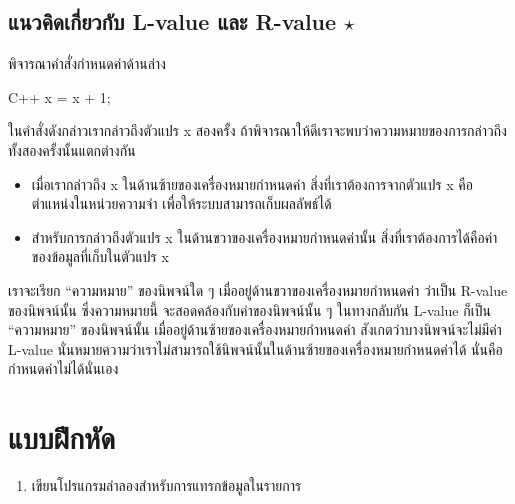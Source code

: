 \subsection{แนวคิด{\wbr}เกี่ยว{\wbr}กับ L-value และ R-value $\star$}
\label{sect:array-lval-rval}

พิจารณา{\wbr}คำ{\wbr}สั่ง{\wbr}กำหนด{\wbr}ค่า{\wbr}ด้าน{\wbr}ล่าง{\wbr}

\latintext
\begin{codelist}{C++}{}
x = x + 1;
\end{codelist}
\thaitext

ใน{\wbr}คำ{\wbr}สั่ง{\wbr}ดัง{\wbr}กล่าว{\wbr}เรา{\wbr}กล่าว{\wbr}ถึง{\wbr}ตัวแปร {\ct x} สอง{\wbr}ครั้ง{\wbr}
ถ้า{\wbr}พิจารณา{\wbr}ให้{\wbr}ดี{\wbr}เรา{\wbr}จะ{\wbr}พบ{\wbr}ว่า{\wbr}ความหมาย{\wbr}ของ{\wbr}การ{\wbr}กล่าว{\wbr}ถึง{\wbr}ทั้ง{\wbr}สอง{\wbr}ครั้ง{\wbr}นั้น{\wbr}แตก{\wbr}ต่าง{\wbr}กัน{\wbr}

\begin{itemize}
\item เมื่อ{\wbr}เรา{\wbr}กล่าว{\wbr}ถึง {\ct x} ใน{\wbr}ด้าน{\wbr}ซ้าย{\wbr}ของ{\wbr}เครื่องหมาย{\wbr}กำหนด{\wbr}ค่า{\wbr}
  สิ่ง{\wbr}ที่{\wbr}เรา{\wbr}ต้องการ{\wbr}จาก{\wbr}ตัวแปร {\ct x} คือ{\wbr}ตำแหน่ง{\wbr}ใน{\wbr}หน่วย{\wbr}ความ{\wbr}จำ{\wbr}
  เพื่อ{\wbr}ให้{\wbr}ระบบ{\wbr}สามารถ{\wbr}เก็บ{\wbr}ผลลัพธ์{\wbr}ได้{\wbr}
\item สำหรับ{\wbr}การ{\wbr}กล่าว{\wbr}ถึง{\wbr}ตัวแปร {\ct x} ใน{\wbr}ด้าน{\wbr}ขวา{\wbr}ของ{\wbr}เครื่องหมาย{\wbr}กำหนด{\wbr}ค่า{\wbr}นั้น{\wbr}
  สิ่ง{\wbr}ที่{\wbr}เรา{\wbr}ต้องการ{\wbr}ได้{\wbr}คือ{\wbr}ค่า{\wbr}ของ{\wbr}ข้อมูล{\wbr}ที่{\wbr}เก็บ{\wbr}ใน{\wbr}ตัวแปร {\ct x}
\end{itemize}

เรา{\wbr}จะ{\wbr}เรียก ``ความหมาย'' ของ{\wbr}นิพจน์{\wbr}ใด ๆ เมื่อ{\wbr}อยู่{\wbr}ด้าน{\wbr}ขวา{\wbr}ของ{\wbr}เครื่องหมาย{\wbr}กำหนด{\wbr}ค่า{\wbr}
ว่า{\wbr}เป็น R-value ของ{\wbr}นิพจน์{\wbr}นั้น ซึ่ง{\wbr}ความหมาย{\wbr}นี้ จะ{\wbr}สอดคล้อง{\wbr}กับ{\wbr}ค่า{\wbr}ของ{\wbr}นิพจน์{\wbr}นั้น ๆ
ใน{\wbr}ทาง{\wbr}กลับ{\wbr}กัน L-value ก็{\wbr}เป็น ``ความหมาย'' ของ{\wbr}นิพจน์{\wbr}นั้น{\wbr}
เมื่อ{\wbr}อยู่{\wbr}ด้าน{\wbr}ซ้าย{\wbr}ของ{\wbr}เครื่องหมาย{\wbr}กำหนด{\wbr}ค่า สังเกต{\wbr}ว่า{\wbr}บาง{\wbr}นิพจน์{\wbr}จะ{\wbr}ไม่{\wbr}มี{\wbr}ค่า L-value
นั่น{\wbr}หมายความ{\wbr}ว่า{\wbr}เรา{\wbr}ไม่{\wbr}สามารถ{\wbr}ใช้{\wbr}นิพจน์{\wbr}นั้น{\wbr}ใน{\wbr}ด้าน{\wbr}ซ้าย{\wbr}ของ{\wbr}เครื่องหมาย{\wbr}กำหนด{\wbr}ค่า{\wbr}ได้ นั่น{\wbr}คือ{\wbr}
กำหนด{\wbr}ค่า{\wbr}ไม่{\wbr}ได้{\wbr}นั่นเอง{\wbr}

\section{แบบฝึกหัด}

\begin{enumerate}
\item เขียน{\wbr}โปรแกรม{\wbr}ลำลอง{\wbr}สำหรับ{\wbr}การ{\wbr}แทรก{\wbr}ข้อมูล{\wbr}ใน{\wbr}รายการ{\wbr}
\end{enumerate}
